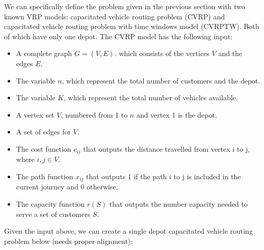 \documentclass[a4paper, 12pt]{report}
\begin{document}
We can specifically define the problem given in the previous section with two known VRP models: capacitated
vehicle routing problem (CVRP) and capacitated vehicle routing problem
with time windows model (CVRPTW). Both of which have only one depot. The CVRP model has the following input:
\begin{itemize}
\item A complete graph \(G = (V, E)\). which consists of the vertices \(V\) and the edges \(E\).
\item The variable \(n\), which represent the total number of customers and the depot.
\item The variable \(K\), which represent the total number of vehicles available.
\item A vertex set \(V\), numbered from 1 to \(n\) and vertex 1 is the depot.
\item A set of edges for \(V\).
\item The cost function \(c_{ij}\) that outputs the distance travelled from vertex i to j, where \(i,j \in V\).
\item The path function \(x_{ij}\) that outputs 1 if the path i to j is included in the current journey and 0 otherwise.
\item The capacity function \(r(S)\) that outputs the number capacity needed to serve a set of customers \(S\).
\end{itemize}

Given the input above, we can create a single depot capacitated vehicle routing problem below (needs proper alignment):

\vspace{0.5cm}
\end{document}
